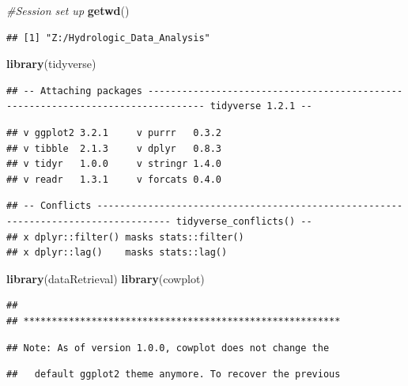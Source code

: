 \documentclass[]{article}
\newenvironment{Shaded}{\begin{snugshade}}{\end{snugshade}}
\newcommand{\CommentTok}[1]{\textcolor[rgb]{0.56,0.35,0.01}{\textit{#1}}}
\newcommand{\KeywordTok}[1]{\textcolor[rgb]{0.13,0.29,0.53}{\textbf{#1}}}
\newcommand{\NormalTok}[1]{#1}
\begin{document}
\begin{Shaded}
\begin{Highlighting}[]
\CommentTok{#Session set up}
\KeywordTok{getwd}\NormalTok{()}
\end{Highlighting}
\end{Shaded}

\begin{verbatim}
## [1] "Z:/Hydrologic_Data_Analysis"
\end{verbatim}

\begin{Shaded}
\begin{Highlighting}[]
\KeywordTok{library}\NormalTok{(tidyverse)}
\end{Highlighting}
\end{Shaded}

\begin{verbatim}
## -- Attaching packages -------------------------------------------------------------------------------- tidyverse 1.2.1 --
\end{verbatim}

\begin{verbatim}
## v ggplot2 3.2.1     v purrr   0.3.2
## v tibble  2.1.3     v dplyr   0.8.3
## v tidyr   1.0.0     v stringr 1.4.0
## v readr   1.3.1     v forcats 0.4.0
\end{verbatim}

\begin{verbatim}
## -- Conflicts ----------------------------------------------------------------------------------- tidyverse_conflicts() --
## x dplyr::filter() masks stats::filter()
## x dplyr::lag()    masks stats::lag()
\end{verbatim}

\begin{Shaded}
\begin{Highlighting}[]
\KeywordTok{library}\NormalTok{(dataRetrieval)}
\KeywordTok{library}\NormalTok{(cowplot)}
\end{Highlighting}
\end{Shaded}

\begin{verbatim}
## 
## ********************************************************
\end{verbatim}

\begin{verbatim}
## Note: As of version 1.0.0, cowplot does not change the
\end{verbatim}

\begin{verbatim}
##   default ggplot2 theme anymore. To recover the previous
\end{verbatim}
\end{document}
